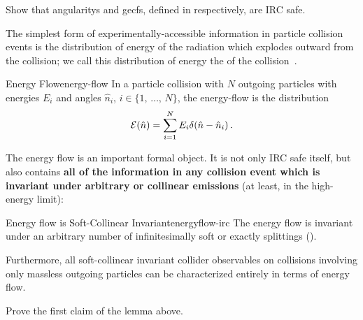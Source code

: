 \begin{exercise}{}
    Show that \glspl{angularity} and \glspl{gecf}, defined in  respectively, are IRC safe.
\end{exercise}



The simplest form of experimentally-accessible information in particle collision events is the distribution of energy of the radiation which explodes outward from the collision;
%
we call this distribution of energy the  of the collision~\cite{Sterman:1975xv, Basham:1977iq, Basham:1978bw, Basham:1978zq, Basham:1979gh,Mazzilli:2024ots,CMS:2024mlf,Tamis:2023guc}.
\begin{definitionbox}{Energy Flow}{energy-flow}
    In a particle collision with \(N\) outgoing particles with energies \(E_i\) and angles \(\hat n_i\), \(i \in \{1,\,\ldots,\,N\}\), the \gls{energy-flow} is the distribution
    \begin{equation}
      \label{eq:energy-flow}
      \mc E(\hat n) = \sum_{i=1}^N E_i \delta(\hat n - \hat n_i)
      \,.
    \end{equation}

\end{definitionbox}

The energy flow is an important formal object.
%
It is not only IRC safe itself, but also contains \textbf{all of the information in any collision event which is invariant under arbitrary  or collinear emissions} (at least, in the high-energy limit):

\begin{lemma}{Energy flow is Soft-Collinear Invariant}{energyflow-irc}
    The energy flow is invariant under an arbitrary number of infinitesimally soft or exactly  splittings ().

    Furthermore, all soft-collinear invariant collider observables on collisions involving only massless outgoing particles can be characterized entirely in terms of energy flow.
\end{lemma}


\begin{exercise}
    Prove the first claim of the lemma above.
\end{exercise}


